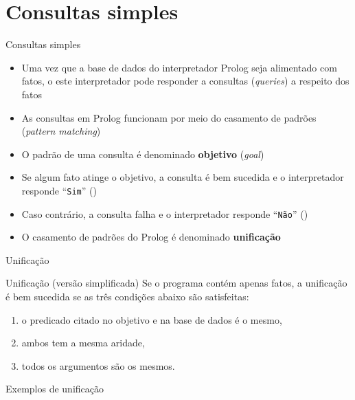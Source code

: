\section{Consultas simples}

\begin{frame}[fragile]{Consultas simples}

    \begin{itemize}
        \item Uma vez que a base de dados do interpretador Prolog seja alimentado com fatos, o
            este interpretador pode responder a consultas (\textit{queries}) a respeito dos
            fatos

        \item As consultas em Prolog funcionam por meio do casamento de padrões
            (\textit{pattern matching})

        \item O padrão de uma consulta é denominado \textbf{objetivo} (\textit{goal})

        \item Se algum fato atinge o objetivo, a consulta é bem sucedida e o interpretador
            responde ``\texttt{Sim}'' ()

        \item Caso contrário, a consulta falha e o interpretador responde ``\texttt{Não}''
            ()

        \item O casamento de padrões do Prolog é denominado \textbf{unificação}

    \end{itemize}

\end{frame}

\begin{frame}[fragile]{Unificação}

    \begin{block}{Unificação (versão simplificada)}
        Se o programa contém apenas fatos, a unificação é bem sucedida se as três condições
            abaixo são satisfeitas:
        \begin{enumerate}
            \item o predicado citado no objetivo e na base de dados é o mesmo,
            \item ambos tem a mesma aridade,
            \item todos os argumentos são os mesmos.
        \end{enumerate}

    \end{block}

\end{frame}

\begin{frame}[fragile]{Exemplos de unificação}


\end{frame}
